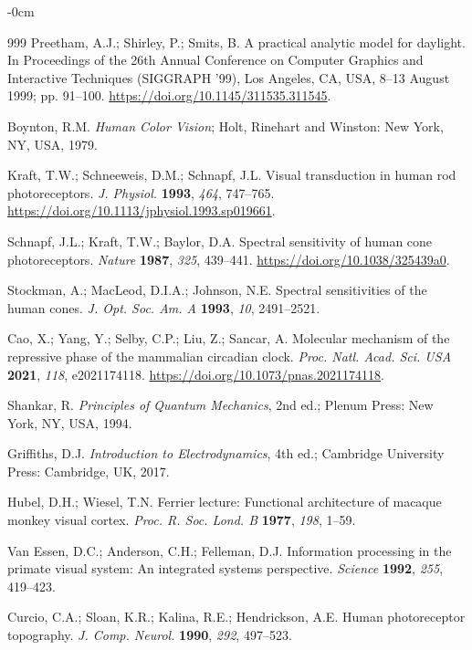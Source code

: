 \documentclass[brainsci,article,submit,moreauthors]{Definitions/mdpi}
\begin{document}
\begin{adjustwidth}{-\extralength}{0cm}
\begin{thebibliography}{999}
Preetham, A.J.; Shirley, P.; Smits, B. A practical analytic model for daylight. In Proceedings of the 26th Annual Conference on Computer Graphics and Interactive Techniques (SIGGRAPH '99), Los Angeles, CA, USA, 8--13 August 1999; pp. 91--100. \url{https://doi.org/10.1145/311535.311545}.

Boynton, R.M. \textit{Human Color Vision}; Holt, Rinehart and Winston: New York, NY, USA, 1979.

Kraft, T.W.; Schneeweis, D.M.; Schnapf, J.L. Visual transduction in human rod photoreceptors. \textit{J. Physiol.} \textbf{1993}, \textit{464}, 747--765. \url{https://doi.org/10.1113/jphysiol.1993.sp019661}.

Schnapf, J.L.; Kraft, T.W.; Baylor, D.A. Spectral sensitivity of human cone photoreceptors. \textit{Nature} \textbf{1987}, \textit{325}, 439--441. \url{https://doi.org/10.1038/325439a0}.

Stockman, A.; MacLeod, D.I.A.; Johnson, N.E. Spectral sensitivities of the human cones. \textit{J. Opt. Soc. Am. A} \textbf{1993}, \textit{10}, 2491--2521.

Cao, X.; Yang, Y.; Selby, C.P.; Liu, Z.; Sancar, A. Molecular mechanism of the repressive phase of the mammalian circadian clock. \textit{Proc. Natl. Acad. Sci. USA} \textbf{2021}, \textit{118}, e2021174118. \url{https://doi.org/10.1073/pnas.2021174118}.

Shankar, R. \textit{Principles of Quantum Mechanics}, 2nd ed.; Plenum Press: New York, NY, USA, 1994.

Griffiths, D.J. \textit{Introduction to Electrodynamics}, 4th ed.; Cambridge University Press: Cambridge, UK, 2017.

Hubel, D.H.; Wiesel, T.N. Ferrier lecture: Functional architecture of macaque monkey visual cortex. \textit{Proc. R. Soc. Lond. B} \textbf{1977}, \textit{198}, 1--59.

Van Essen, D.C.; Anderson, C.H.; Felleman, D.J. Information processing in the primate visual system: An integrated systems perspective. \textit{Science} \textbf{1992}, \textit{255}, 419--423.

Curcio, C.A.; Sloan, K.R.; Kalina, R.E.; Hendrickson, A.E. Human photoreceptor topography. \textit{J. Comp. Neurol.} \textbf{1990}, \textit{292}, 497--523.


\end{thebibliography}
\end{adjustwidth}
\end{document}
